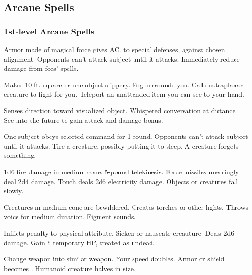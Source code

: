 \subsection{Arcane Spells}\label{Arcane Spells}
\subsubsection{1st-level Arcane Spells}
\begin{swspelllist}
     Armor made of magical force gives  AC.
    to special defenses,  against chosen alignment.
   Opponents can't attack subject until it attacks.
   Immediately reduce damage from foes' spells.

   Makes 10 ft. square or one object slippery.
   Fog surrounds you.
   Calls extraplanar creature to fight for you.
   Teleport an unattended item you can see to your hand.

  \spellhead[Div]{}
   Senses direction toward visualized object.
   Whispered conversation at distance.
   See into the future to gain attack and damage bonus.

   One subject obeys selected command for 1 round.
   Opponents can't attack subject until it attacks.
   Tire a creature, possibly putting it to sleep.
   A creature forgets something.

   1d6 fire damage in medium cone.
   5-pound telekinesis.
   Force missiles unerringly deal 2d4 damage.
   Touch deals 2d6 electricity damage.
   Objects or creatures fall slowly.

   Creatures in medium cone are bewildered.
   Creates torches or other lights.
   Throws voice for medium duration.
   Figment sounds.

   Inflicts  penalty to physical attribute.
   Sicken or nauseate creauture.
   Deals 2d6 damage.
   Gain 5 temporary HP, treated as undead.

   Change weapon into similar weapon.
   Your speed doubles.
   Armor or shield becomes .
   Humanoid creature halves in size.
\end{swspelllist}

